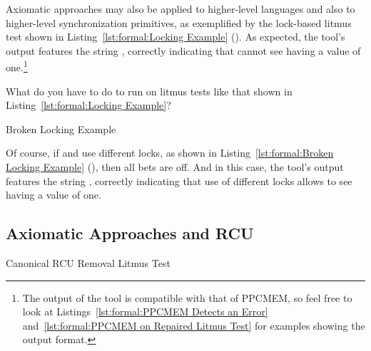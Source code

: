 Axiomatic approaches may also be applied to higher-level
languages and also to higher-level synchronization primitives, as
exemplified by the lock-based litmus test shown in
Listing~\ref{lst:formal:Locking Example} ().
As expected, the  tool's output features the string ,
correctly indicating that  cannot see  having a value
of one.\footnote{
	The output of the  tool is compatible with that
	of PPCMEM, so feel free to look at
	Listings~\ref{lst:formal:PPCMEM Detects an Error}
	and~\ref{lst:formal:PPCMEM on Repaired Litmus Test}
	for examples showing the output format.}
\fi

\QuickQuiz{}
	What do you have to do to run  on litmus tests like
	that shown in Listing~\ref{lst:formal:Locking Example}?
 \QuickQuizEnd

\begin{listing}[tb]

\caption{Broken Locking Example}
\label{lst:formal:Broken Locking Example}
\end{listing}

Of course, if  and  use different locks, as shown in
Listing~\ref{lst:formal:Broken Locking Example} (),
then all bets are off.
And in this case, the  tool's output features the string
, correctly indicating that use of different locks allows
 to see  having a value of one.

\subsection{Axiomatic Approaches and RCU}
\label{sec:formal:Axiomatic Approaches and RCU}

\begin{listing}[tb]

\caption{Canonical RCU Removal Litmus Test}
\label{lst:formal:Canonical RCU Removal Litmus Test}
\end{listing}

